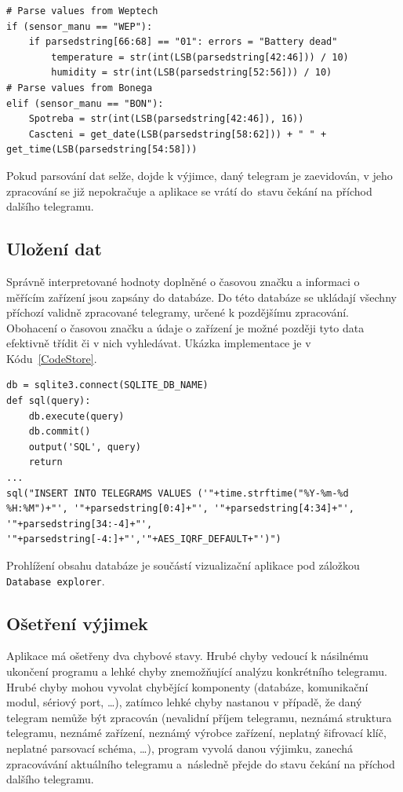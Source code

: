 \begin{lstlisting}[caption={Ukázka parsování dat},captionpos=b,label=CodeParse,style=MyCodePython]
# Parse values from Weptech
if (sensor_manu == "WEP"):
	if parsedstring[66:68] == "01": errors = "Battery dead"
		temperature = str(int(LSB(parsedstring[42:46])) / 10)
		humidity = str(int(LSB(parsedstring[52:56])) / 10)
# Parse values from Bonega       
elif (sensor_manu == "BON"):
	Spotreba = str(int(LSB(parsedstring[42:46]), 16))
	Cascteni = get_date(LSB(parsedstring[58:62])) + " " + get_time(LSB(parsedstring[54:58]))
\end{lstlisting}
Pokud parsování dat selže, dojde k výjimce, daný telegram je zaevidován, v jeho zpracování se již nepokračuje a aplikace se vrátí do~stavu čekání na příchod dalšího telegramu.

\subsection{Uložení dat}
\label{SectionUlozeniDatabaze2}
Správně interpretované hodnoty doplněné o časovou značku a informaci o měřícím zařízení jsou zapsány do databáze. Do této databáze se ukládají všechny příchozí validně zpracované telegramy, určené k pozdějšímu zpracování. Obohacení o časovou značku a údaje o zařízení je možné později tyto data efektivně třídit či v nich vyhledávat. Ukázka implementace je v Kódu~\ref{CodeStore}.

\vspace{10pt}

\begin{lstlisting}[caption={Ukázka ukládání dat},captionpos=b,label=CodeStore,style=MyCodePython]
db = sqlite3.connect(SQLITE_DB_NAME)
def sql(query):
    db.execute(query)
    db.commit()
    output('SQL', query)
    return
...
sql("INSERT INTO TELEGRAMS VALUES ('"+time.strftime("%Y-%m-%d %H:%M")+"', '"+parsedstring[0:4]+"', '"+parsedstring[4:34]+"', '"+parsedstring[34:-4]+"', '"+parsedstring[-4:]+"','"+AES_IQRF_DEFAULT+"')")		
\end{lstlisting}

Prohlížení obsahu databáze je součástí vizualizační aplikace pod záložkou \texttt{Database explorer}.


\subsection{Ošetření výjimek}
\label{SectionUlozeniLogu}
Aplikace má ošetřeny dva chybové stavy. Hrubé chyby vedoucí k násilnému ukončení programu a lehké chyby znemožňující analýzu konkrétního telegramu. Hrubé chyby mohou vyvolat chybějící komponenty (databáze, komunikační modul, sériový port, \ldots), zatímco lehké chyby nastanou v případě, že daný telegram nemůže být zpracován (nevalidní příjem telegramu, neznámá struktura telegramu, neznámé zařízení, neznámý výrobce zařízení, neplatný šifrovací klíč, neplatné parsovací schéma, \ldots ), program vyvolá danou výjimku, zanechá zpracovávání aktuálního telegramu a~následně přejde do stavu čekání na příchod dalšího telegramu.

